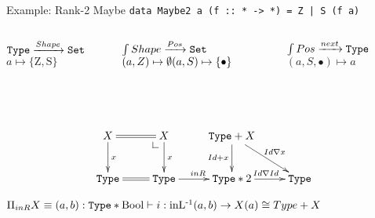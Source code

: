 \documentclass{beamer}
\makeatletter
\newcommand{\dlpullback}[1][dl]{\save*!/#1-1.2pc/#1:(-1,1)@^{|-}\restore}
\newcommand{\Set}{{\tt Set }}
\newcommand{\Type}{{\tt Type }}
\makeatother
\begin{document}
\begin{frame}[fragile]{Example: Rank-2 Maybe}
\lstinline+data Maybe2 a (f :: * -> *) = Z | S (f a)+
\pause
\begin{columns}
\begin{block}{$\Type \xrightarrow{Shape} \Set$}
$a \mapsto \{\mbox{Z},\mbox{S}\}$
\end{block}

\begin{block}{$\int Shape \xrightarrow{Pos} \Set$}
$(a, Z) \mapsto \emptyset\\
(a, S) \mapsto \{\bullet\}$
\end{block}

\begin{block}{$\int Pos \xrightarrow{next} \Type$}
$(a,S,\bullet) \mapsto a$
\end{block}
\end{columns}
\\~\\
\pause
 \[\xymatrix{
 X \ar[d]^{x} \ar@{=}[r] & X \ar[d]^{x} \dlpullback & \Type + X \ar[d]_{Id + x} \ar[dr]^{Id \nabla x} & \\
 \Type & \Type \ar@{=}[l] \ar[r]^{inR} & \Type * 2 \ar[r]^{Id \nabla Id} & \Type}\]
\pause
 
  $\Pi_{inR} X \equiv \\
  (a,b) : \Type * \mbox{Bool} \vdash i : \operatorname{inL^{-1}} (a,b) \to X(a)\\
  \cong Type + X$

\end{frame}
\end{document}
